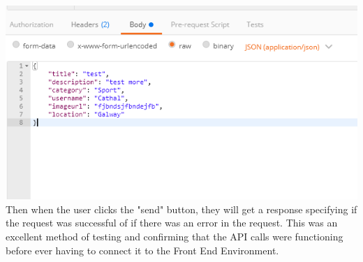 \includegraphics[scale = 0.8]{img/postman-JSON.PNG} \newline
Then when the user clicks the "send" button, they will get a response specifying if the request was successful of if there was an error in the request. This was an excellent method of testing and confirming that the API calls were functioning before ever having to connect it to the Front End Environment.

